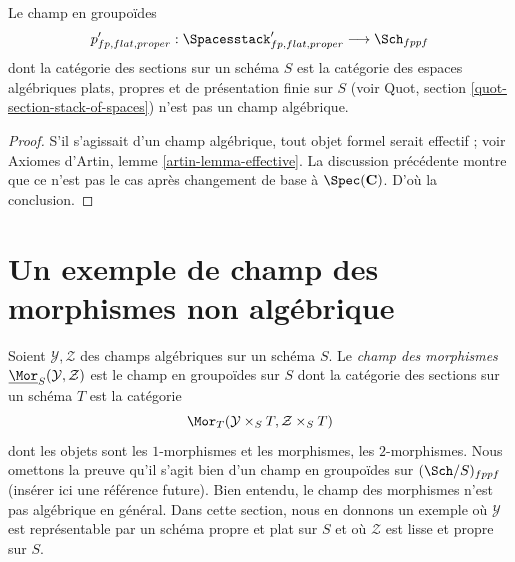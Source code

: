 \begin{lemma}
\label{lemma-proper-spaces-not-algebraic}
Le champ en groupoïdes
$$
p'_{fp, flat, proper} :
\Spacesstack'_{fp, flat, proper}
\longrightarrow
\Sch_{fppf}
$$
dont la catégorie des sections sur un schéma $S$ est la catégorie des
espaces algébriques plats, propres et de présentation finie sur $S$
(voir Quot, section \ref{quot-section-stack-of-spaces})
n'est pas un champ algébrique.
\end{lemma}

\begin{proof}
S'il s'agissait d'un champ algébrique, tout objet formel serait
effectif ; voir Axiomes d'Artin, lemme \ref{artin-lemma-effective}.
La discussion précédente montre que ce n'est pas le cas
après changement de base à $\Spec(\mathbf{C})$.
D'où la conclusion.
\end{proof}






\section{Un exemple de champ des morphismes non algébrique}
\label{section-non-algebraic-hom-stack}

\noindent
Soient $\mathcal{Y}, \mathcal{Z}$ des champs algébriques sur un schéma $S$.
Le {\it champ des morphismes} $\underline{\Mor}_S(\mathcal{Y}, \mathcal{Z})$
est le champ en groupoïdes sur $S$ dont la catégorie des sections sur
un schéma $T$ est la catégorie
$$
\Mor_T(\mathcal{Y} \times_S T, \mathcal{Z} \times_S T)
$$
dont les objets sont les $1$-morphismes et les morphismes, les $2$-morphismes.
Nous omettons la preuve qu'il s'agit bien d'un champ en groupoïdes sur
$(\Sch/S)_{fppf}$ (insérer ici une référence future). Bien entendu,
le champ des morphismes n'est pas algébrique en général.
Dans cette section,
nous en donnons un exemple où $\mathcal{Y}$ est représentable par un schéma
propre et plat sur $S$ et où $\mathcal{Z}$ est lisse et propre sur $S$.

